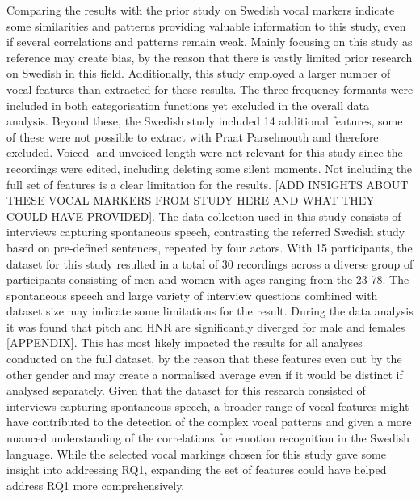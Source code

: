Comparing the results with the prior study on Swedish vocal markers indicate some similarities and patterns providing valuable information to this study, even if several correlations and patterns remain weak. Mainly focusing on this study as reference may create bias, by the reason that there is vastly limited prior research on Swedish in this field. Additionally, this study employed a larger number of vocal features than extracted for these results. The three frequency formants were included in both categorisation functions yet excluded in the overall data analysis. Beyond these, the Swedish study included 14 additional features, some of these were not possible to extract with Praat Parselmouth and therefore excluded. Voiced- and unvoiced length were not relevant for this study since the recordings were edited, including deleting some silent moments. Not including the full set of features is a clear limitation for the results. [ADD INSIGHTS ABOUT THESE VOCAL MARKERS FROM STUDY HERE AND WHAT THEY COULD HAVE PROVIDED]. The data collection used in this study consists of interviews capturing spontaneous speech, contrasting the referred Swedish study based on pre-defined sentences, repeated by four actors. With 15 participants, the dataset for this study resulted in a total of 30 recordings across a diverse group of participants consisting of men and women with ages ranging from the 23-78. The spontaneous speech and large variety of interview questions combined with dataset size may indicate some limitations for the result. During the data analysis it was found that pitch and HNR are significantly diverged for male and females [APPENDIX]. This has most likely impacted the results for all analyses conducted on the full dataset, by the reason that these features even out by the other gender and may create a normalised average even if it would be distinct if analysed separately. 
Given that the dataset for this research consisted of interviews capturing spontaneous speech, a broader range of vocal features might have contributed to the detection of the complex vocal patterns and given a more
nuanced understanding of the correlations for emotion recognition in the Swedish language. While the selected vocal markings chosen for this study gave some insight into addressing RQ1, expanding the set of features could have helped address RQ1 more comprehensively.


\medskip
